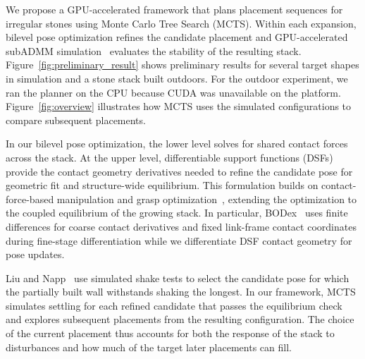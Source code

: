 We propose a GPU-accelerated framework that plans placement sequences for irregular stones using Monte Carlo Tree Search (MCTS).
Within each expansion, bilevel pose optimization refines the candidate placement and GPU-accelerated subADMM simulation~\cite{ji2025gpu} evaluates the stability of the resulting stack.
Figure~\ref{fig:preliminary_result} shows preliminary results for several target shapes in simulation and a stone stack built outdoors. For the outdoor experiment, we ran the planner on the CPU because CUDA was unavailable on the platform.
Figure~\ref{fig:overview} illustrates how MCTS uses the simulated configurations to compare subsequent placements.

In our bilevel pose optimization, the lower level solves for shared contact forces across the stack. At the upper level, differentiable support functions (DSFs)~\cite{lee2023uncertain,an2024riemannianmtd} provide the contact geometry derivatives needed to refine the candidate pose for geometric fit and structure-wide equilibrium.
This formulation builds on contact-force-based manipulation and grasp optimization~\cite{lee2025contactfactorgraph,zurbrugg2025graspqp,chen2025bodex}, extending the optimization to the coupled equilibrium of the growing stack.
In particular, BODex~\cite{chen2025bodex} uses finite differences for coarse contact derivatives and fixed link-frame contact coordinates during fine-stage differentiation while we differentiate DSF contact geometry for pose updates.

Liu and Napp~\cite{liu2023stability} use simulated shake tests to select the candidate pose for which the partially built wall withstands shaking the longest.
In our framework, MCTS simulates settling for each refined candidate that passes the equilibrium check and explores subsequent placements from the resulting configuration.
The choice of the current placement thus accounts for both the response of the stack to disturbances and how much of the target later placements can fill.

